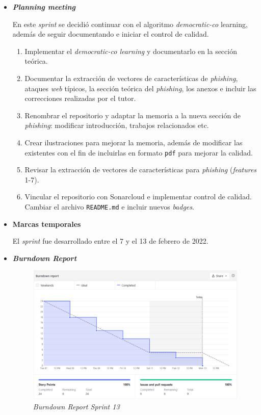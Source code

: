 \begin{itemize}
	\item \textbf{\textit{Planning meeting}}
	
	En este \textit{sprint} se decidió continuar con el algoritmo \textit{democratic-co} learning, además de seguir documentando e iniciar el control de calidad.
	
	\begin{enumerate}
		\item Implementar el \textit{democratic-co learning} y documentarlo en la sección teórica.
		\item Documentar la extracción de vectores de características de \textit{phishing}, ataques \textit{web} típicos, la sección teórica del \textit{phishing}, los anexos e incluir las correcciones realizadas por el tutor.
		\item Renombrar el repositorio y adaptar la memoria a la nueva sección de \textit{phishing}: modificar introducción, trabajos relacionados etc.
		\item Crear ilustraciones para mejorar la memoria, además de modificar las existentes con el fin de incluirlas en formato \texttt{pdf} para mejorar la calidad.
		\item Revisar la extracción de vectores de características para \textit{phishing} (\textit{features} 1-7).
		\item Vincular el repositorio con Sonarcloud e implementar control de calidad. Cambiar el archivo \texttt{README.md} e incluir nuevos \textit{badges}.
	\end{enumerate}
	\item \textbf{Marcas temporales}		
	
	El \textit{sprint} fue desarrollado entre el 7 y el 13 de febrero de 2022.
	
	\item \textbf{\textit{Burndown Report}}
	
	\begin{figure}[h]
		\caption[\textit{Sprint} 13: \textit{burndown report}]{\textit{Burndown Report Sprint 13}}
		\centering
		\includegraphics[width=\textwidth]{../img/anexos/bdr/s13_bdr}
	\end{figure}


\end{itemize}
